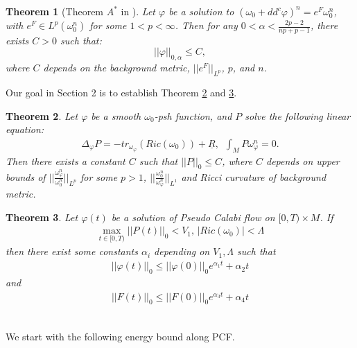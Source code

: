 \documentclass[11pt]{amsart}
\newtheorem{thm}{Theorem}[section]
\numberwithin{equation}{section}
\begin{document}
\begin{thm}[Theorem $A^*$ in \cite{DDGH2008}]\label{TMDD}
	Let $\varphi$ be a solution to $(\omega_0+dd^c\varphi)^n=e^F\omega_0^n$,  with $e^F\in L^p(\omega_0^n)$ for some $1<p<\infty$.  Then for any $0<\alpha<\frac{2p-2}{np+p-1}$,  there exists $C>0$ such that:
	\begin{equation*}
	||\varphi||_{0,\alpha}\le  C,
	\end{equation*}
	where $C$ depends on the background metric,  $||e^F||_{L^p}$,  $p$,  and $n$. \\
\end{thm}

\noindent
Our goal in Section 2 is to establish Theorem \ref{MT21} and \ref{MT22}. \\

\begin{thm}\label{MT21}
	Let $\varphi$ be a smooth $\omega_0$-psh function,  and $P$ solve the following linear equation:
	\begin{align}
		\Delta_{\varphi}P=-tr_{\omega_{\varphi}}(Ric(\omega_0))+\underline{R},\,\,\,\int_MP\omega_{\varphi}^n=0. 
	\end{align}
	Then there exists a constant $C$ such that $||P||_0\le  C$,  where $C$ depends on upper bounds of $||\frac{\omega_{\varphi}^n}{\omega_0^n}||_{L^p}$ for some $p>1$, $||\frac{\omega_{0}^n}{\omega_{\varphi}^n}||_{L^1}$ and Ricci curvature of background metric. \\
\end{thm}

\begin{thm}\label{MT22}
	Let $\varphi(t)$ be a solution of Pseudo Calabi flow on $[0,T)\times M$. If 
	\begin{align}
		\max_{t\in [0,T)} ||P(t)||_0 < V_1 , \, |Ric(\omega_0)|<\Lambda
	\end{align}
	then there exist some constants $\alpha_i$ depending on $V_1, \Lambda$ such that 
	\begin{align}
		||\varphi(t)||_0 \le  ||\varphi(0)||_0 e^{\alpha_1t}+\alpha_2 t
	\end{align}
	and 
	\begin{align}
		||F(t)||_0 \le   ||F(0)||_0 e^{\alpha_3 t} +\alpha_4 t
	\end{align} \\
\end{thm}



\noindent
We start with the following energy bound along PCF. 
\end{document}
